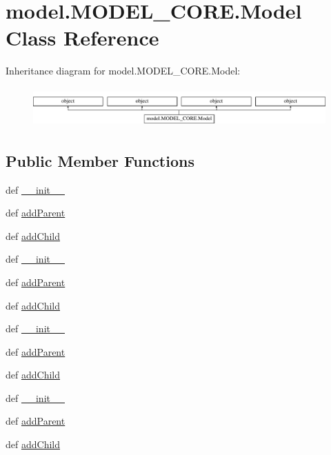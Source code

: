 \hypertarget{classmodel_1_1MODEL__CORE_1_1Model}{}\section{model.\+M\+O\+D\+E\+L\+\_\+\+C\+O\+R\+E.\+Model Class Reference}
\label{classmodel_1_1MODEL__CORE_1_1Model}
Inheritance diagram for model.\+M\+O\+D\+E\+L\+\_\+\+C\+O\+R\+E.\+Model\+:\begin{figure}[H]
\begin{center}
\leavevmode
\includegraphics[height=1.530055cm]{classmodel_1_1MODEL__CORE_1_1Model}
\end{center}
\end{figure}
\subsection*{Public Member Functions}
\begin{DoxyCompactItemize}
\item 
def \hyperlink{classmodel_1_1MODEL__CORE_1_1Model_a1176b19897a48d0ad5caa2206abc48c2}{\+\_\+\+\_\+init\+\_\+\+\_\+}
\item 
def \hyperlink{classmodel_1_1MODEL__CORE_1_1Model_a3ef7c7b720e9dc220758de25f1ec8e62}{add\+Parent}
\item 
def \hyperlink{classmodel_1_1MODEL__CORE_1_1Model_a0ce62fa25018f20b53b36b38d73f61c3}{add\+Child}
\item 
def \hyperlink{classmodel_1_1MODEL__CORE_1_1Model_a1176b19897a48d0ad5caa2206abc48c2}{\+\_\+\+\_\+init\+\_\+\+\_\+}
\item 
def \hyperlink{classmodel_1_1MODEL__CORE_1_1Model_a3ef7c7b720e9dc220758de25f1ec8e62}{add\+Parent}
\item 
def \hyperlink{classmodel_1_1MODEL__CORE_1_1Model_a0ce62fa25018f20b53b36b38d73f61c3}{add\+Child}
\item 
def \hyperlink{classmodel_1_1MODEL__CORE_1_1Model_a1176b19897a48d0ad5caa2206abc48c2}{\+\_\+\+\_\+init\+\_\+\+\_\+}
\item 
def \hyperlink{classmodel_1_1MODEL__CORE_1_1Model_a3ef7c7b720e9dc220758de25f1ec8e62}{add\+Parent}
\item 
def \hyperlink{classmodel_1_1MODEL__CORE_1_1Model_a0ce62fa25018f20b53b36b38d73f61c3}{add\+Child}
\item 
def \hyperlink{classmodel_1_1MODEL__CORE_1_1Model_a1176b19897a48d0ad5caa2206abc48c2}{\+\_\+\+\_\+init\+\_\+\+\_\+}
\item 
def \hyperlink{classmodel_1_1MODEL__CORE_1_1Model_a3ef7c7b720e9dc220758de25f1ec8e62}{add\+Parent}
\item 
def \hyperlink{classmodel_1_1MODEL__CORE_1_1Model_a0ce62fa25018f20b53b36b38d73f61c3}{add\+Child}
\end{DoxyCompactItemize}
